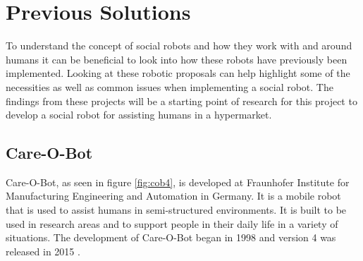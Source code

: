 \chapter{Previous Solutions}\label{ch:PrevSol}
To understand the concept of social robots and how they work with and around humans it can be beneficial to look into how these robots have previously been implemented. Looking at these robotic proposals can help highlight some of the necessities as well as common issues when implementing a social robot. The findings from these projects will be a starting point of research for this project to develop a social robot for assisting humans in a hypermarket.

\section{Care-O-Bot}\label{sec:cob4}
Care-O-Bot, as seen in figure \ref{fig:cob4}, is developed at Fraunhofer Institute for Manufacturing Engineering and Automation in Germany. It is a mobile robot that is used to assist humans in semi-structured environments. It is built to be used in research areas and to support people in their daily life in a variety of situations. The development of Care-O-Bot began in 1998 and version 4 was released in 2015 \cite{cob4}.

